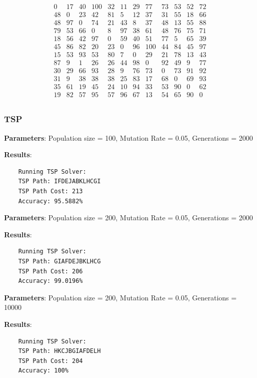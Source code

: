 \documentclass[12pt, a4paper]{article}
\begin{document}
\[
\begin{array}{cccccccccccc}
0 & 17 & 40 & 100 & 32 & 11 & 29 & 77 & 73 & 53 & 52 & 72 \\
48 & 0 & 23 & 42 & 81 & 5 & 12 & 37 & 31 & 55 & 18 & 66 \\
48 & 97 & 0 & 74 & 21 & 43 & 8 & 37 & 48 & 13 & 55 & 88 \\
79 & 53 & 66 & 0 & 8 & 97 & 38 & 61 & 48 & 76 & 75 & 71 \\
18 & 56 & 42 & 97 & 0 & 59 & 40 & 51 & 77 & 5 & 65 & 39 \\
45 & 86 & 82 & 20 & 23 & 0 & 96 & 100 & 44 & 84 & 45 & 97 \\
15 & 53 & 93 & 53 & 80 & 7 & 0 & 29 & 21 & 78 & 13 & 43 \\
87 & 9 & 1 & 26 & 26 & 44 & 98 & 0 & 92 & 49 & 9 & 77 \\
30 & 29 & 66 & 93 & 28 & 9 & 76 & 73 & 0 & 73 & 91 & 92 \\
31 & 9 & 38 & 38 & 38 & 25 & 83 & 17 & 68 & 0 & 69 & 93 \\
35 & 61 & 19 & 45 & 24 & 10 & 94 & 33 & 53 & 90 & 0 & 62 \\
19 & 82 & 57 & 95 & 57 & 96 & 67 & 13 & 54 & 65 & 90 & 0 \\
\end{array}
\]

\subsubsection*{TSP}

\textbf{Parameters}: Population size = 100, Mutation Rate = 0.05, Generations =
2000

\textbf{Results}:
\begin{verbatim}
    Running TSP Solver:
    TSP Path: IFDEJABKLHCGI
    TSP Path Cost: 213
    Accuracy: 95.5882%
\end{verbatim}

\textbf{Parameters}: Population size = 200, Mutation Rate = 0.05, Generations =
2000

\textbf{Results}:
\begin{verbatim}
    Running TSP Solver:
    TSP Path: GIAFDEJBKLHCG
    TSP Path Cost: 206
    Accuracy: 99.0196%
\end{verbatim}

\textbf{Parameters}: Population size = 200, Mutation Rate = 0.05, Generations =
10000

\textbf{Results}:
\begin{verbatim}
    Running TSP Solver:
    TSP Path: HKCJBGIAFDELH
    TSP Path Cost: 204
    Accuracy: 100%
\end{verbatim}
\end{document}
